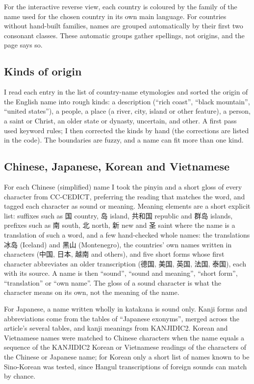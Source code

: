 \documentclass[11pt,a4paper]{article}
\newcommand{\zh}[1]{{\cjk #1}}
\begin{document}
For the interactive reverse view, each country is coloured by the family of the name used for the chosen country in its own main language. For countries without hand-built families, names are grouped automatically by their first two consonant classes. These automatic groups gather spellings, not origins, and the page says so.

\subsection{Kinds of origin}

I read each entry in the list of country-name etymologies and sorted the origin of the English name into rough kinds: a description (``rich coast'', ``black mountain'', ``united states''), a people, a place (a river, city, island or other feature), a person, a saint or Christ, an older state or dynasty, uncertain, and other. A first pass used keyword rules; I then corrected the kinds by hand (the corrections are listed in the code). The boundaries are fuzzy, and a name can fit more than one kind.

\subsection{Chinese, Japanese, Korean and Vietnamese}

For each Chinese (simplified) name I took the pinyin and a short gloss of every character from CC-CEDICT, preferring the reading that matches the word, and tagged each character as sound or meaning. Meaning elements are a short explicit list: suffixes such as \zh{国} country, \zh{岛} island, \zh{共和国} republic and \zh{群岛} islands, prefixes such as \zh{南} south, \zh{北} north, \zh{新} new and \zh{圣} saint where the name is a translation of such a word, and a few hand-checked whole names: the translations \zh{冰岛} (Iceland) and \zh{黑山} (Montenegro), the countries' own names written in characters (\zh{中国}, \zh{日本}, \zh{越南} and others), and five short forms whose first character abbreviates an older transcription (\zh{德国}, \zh{美国}, \zh{英国}, \zh{法国}, \zh{泰国}), each with its source. A name is then ``sound'', ``sound and meaning'', ``short form'', ``translation'' or ``own name''. The gloss of a sound character is what the character means on its own, not the meaning of the name.

For Japanese, a name written wholly in katakana is sound only. Kanji forms and abbreviations come from the tables of ``Japanese exonyms'', merged across the article's several tables, and kanji meanings from KANJIDIC2. Korean and Vietnamese names were matched to Chinese characters when the name equals a sequence of the KANJIDIC2 Korean or Vietnamese readings of the characters of the Chinese or Japanese name; for Korean only a short list of names known to be Sino-Korean was tested, since Hangul transcriptions of foreign sounds can match by chance.
\end{document}
